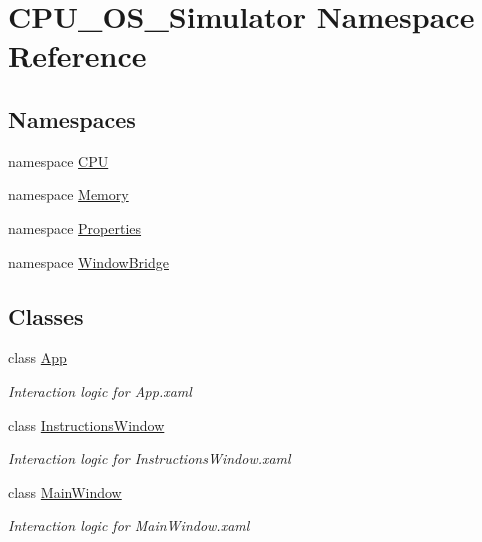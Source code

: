 \hypertarget{namespace_c_p_u___o_s___simulator}{}\section{C\+P\+U\+\_\+\+O\+S\+\_\+\+Simulator Namespace Reference}
\label{namespace_c_p_u___o_s___simulator}
\subsection*{Namespaces}
\begin{DoxyCompactItemize}
\item 
namespace \hyperlink{namespace_c_p_u___o_s___simulator_1_1_c_p_u}{C\+P\+U}
\item 
namespace \hyperlink{namespace_c_p_u___o_s___simulator_1_1_memory}{Memory}
\item 
namespace \hyperlink{namespace_c_p_u___o_s___simulator_1_1_properties}{Properties}
\item 
namespace \hyperlink{namespace_c_p_u___o_s___simulator_1_1_window_bridge}{Window\+Bridge}
\end{DoxyCompactItemize}
\subsection*{Classes}
\begin{DoxyCompactItemize}
\item 
class \hyperlink{class_c_p_u___o_s___simulator_1_1_app}{App}
\begin{DoxyCompactList}\small\item\em Interaction logic for App.\+xaml \end{DoxyCompactList}\item 
class \hyperlink{class_c_p_u___o_s___simulator_1_1_instructions_window}{Instructions\+Window}
\begin{DoxyCompactList}\small\item\em Interaction logic for Instructions\+Window.\+xaml \end{DoxyCompactList}\item 
class \hyperlink{class_c_p_u___o_s___simulator_1_1_main_window}{Main\+Window}
\begin{DoxyCompactList}\small\item\em Interaction logic for Main\+Window.\+xaml \end{DoxyCompactList}\end{DoxyCompactItemize}
